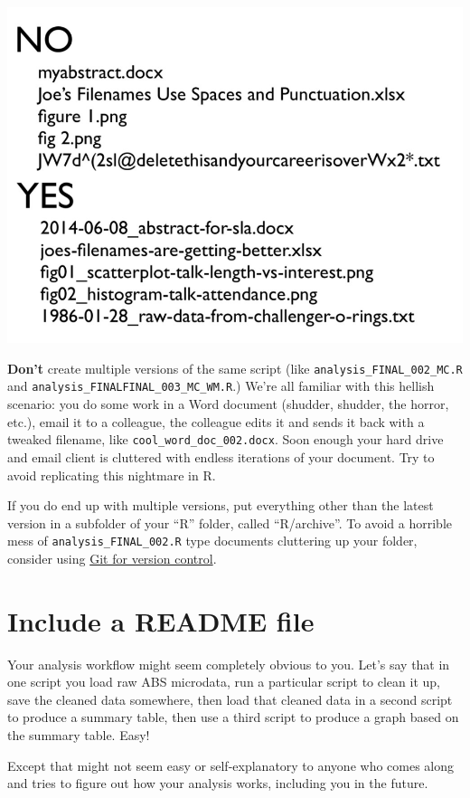 \documentclass[
]{book}
\begin{document}
\begin{center}\includegraphics[width=0.66\linewidth]{atlas/jenny_bryan_filenames} \end{center}

\textbf{Don't} create multiple versions of the same script (like \texttt{analysis\_FINAL\_002\_MC.R} and \texttt{analysis\_FINALFINAL\_003\_MC\_WM.R}.) We're all familiar with this hellish scenario: you do some work in a Word document (shudder, shudder, the horror, etc.), email it to a colleague, the colleague edits it and sends it back with a tweaked filename, like \texttt{cool\_word\_doc\_002.docx}. Soon enough your hard drive and email client is cluttered with endless iterations of your document. Try to avoid replicating this nightmare in R.

If you do end up with multiple versions, put everything other than the latest version in a subfolder of your ``R'' folder, called ``R/archive''. To avoid a horrible mess of \texttt{analysis\_FINAL\_002.R} type documents cluttering up your folder, consider using \protect\hyperlink{version-control}{Git for version control}.

\hypertarget{README}{%
\section{Include a README file}\label{README}}

Your analysis workflow might seem completely obvious to you. Let's say that in one script you load raw ABS microdata, run a particular script to clean it up, save the cleaned data somewhere, then load that cleaned data in a second script to produce a summary table, then use a third script to produce a graph based on the summary table. Easy!

Except that might not seem easy or self-explanatory to anyone who comes along and tries to figure out how your analysis works, including you in the future.
\end{document}
